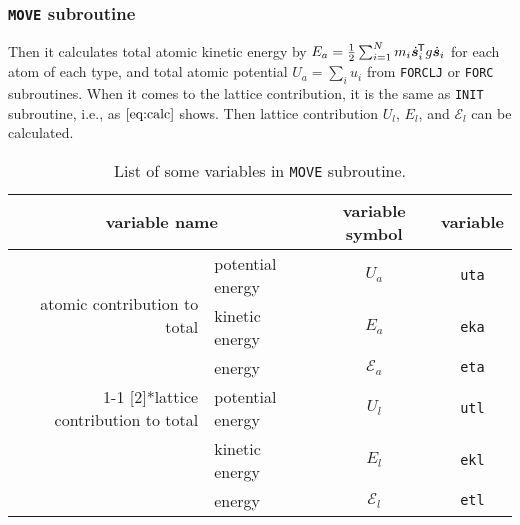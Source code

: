 
\subsubsection{\texttt{MOVE} subroutine}

Then it calculates total atomic kinetic energy by
$E_a = \frac{ 1 }{ 2 } \sum_{i=1}^{N} m_i \dot{ \bm{s} }_i ^{\mkern-1.5mu\mathsf{T}}
g \dot{ \bm{s} }_i$ for each atom of each type,
and total atomic potential $U_a = \sum_{i} u_i$ from \texttt{FORCLJ} or \texttt{FORC}
subroutines.
When it comes to the lattice contribution, it is the same as \texttt{INIT} subroutine,
i.e., as $\eqref{eq:calc}$ shows. Then lattice contribution $U_l$, $E_l$, and 
$\mathscr{E}_l$ can be calculated.

\begin{table}[h]
	\centering
	\caption{List of some variables in \texttt{MOVE} subroutine.}
	\begin{tabular}{@{}rlcc@{}}
		\toprule
		\multicolumn{2}{c}{variable name} & variable symbol & variable \\
		\midrule
		\multirow{3}[2]{*}{atomic contribution to total}                                  & potential energy & $U_a$           & \texttt{uta} \\
		                                                                                  & kinetic energy   & $E_a$           & \texttt{eka} \\
		                                                                                  & energy           & $\mathscr{E}_a$ & \texttt{eta} \\
		\cmidrule{1-1}\cmidrule{4-4}    \multirow{3}[2]{*}{lattice contribution to total} & potential energy & $U_l$           & \texttt{utl} \\
		                                                                                  & kinetic energy   & $E_l$           & \texttt{ekl} \\
		                                                                                  & energy           & $\mathscr{E}_l$ & \texttt{etl} \\
		\bottomrule                                                                              
	\end{tabular}
	\label{tab:move}%
\end{table}%
